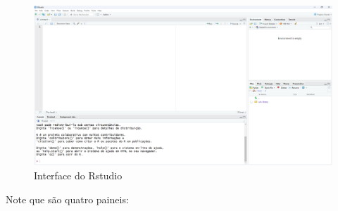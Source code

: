 \documentclass[
  letterpaper,
  DIV=11,
  numbers=noendperiod]{scrreprt}
\begin{document}
\begin{figure}

{\centering \includegraphics{img/rstudio.png}

}

\caption{Interface do Rstudio}

\end{figure}

Note que são quatro paineis:
\end{document}
